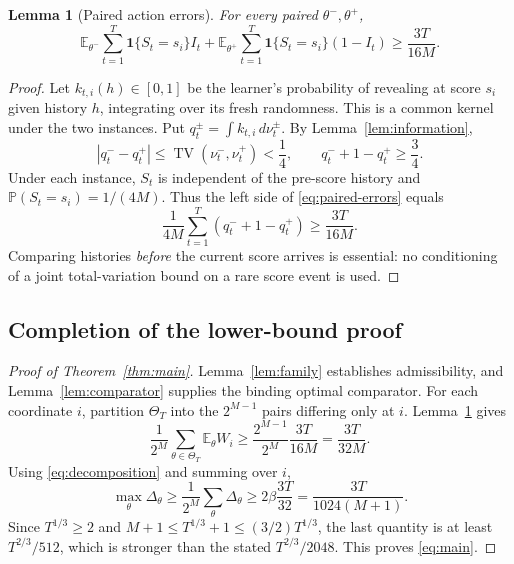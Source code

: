 \documentclass[11pt]{article}
\newtheorem{lemma}[theorem]{Lemma}
\theoremstyle{remark}
\newcommand{\E}{\mathbb E}
\newcommand{\Pp}{\mathbb P}
\newcommand{\ind}{\mathbf 1}
\newcommand{\TV}{\operatorname{TV}}
\begin{document}
\begin{lemma}[Paired action errors]
\label{lem:testing}
For every paired $\theta^-,\theta^+$,
\begin{equation}
 \E_{\theta^-}\sum_{t=1}^T\ind\{S_t=s_i\}I_t
 +\E_{\theta^+}\sum_{t=1}^T\ind\{S_t=s_i\}(1-I_t)
 \ge\frac{3T}{16M}.
 \label{eq:paired-errors}
\end{equation}
\end{lemma}
\begin{proof}
Let $k_{t,i}(h)\in[0,1]$ be the learner's probability of revealing at
score $s_i$ given history $h$, integrating over its fresh randomness.
This is a common kernel under the two instances. Put
$q_t^\pm=\int k_{t,i}\,d\nu_t^\pm$. By Lemma~\ref{lem:information},
\[
 |q_t^--q_t^+|\le\TV(\nu_t^-,\nu_t^+)<\frac14,
 \qquad q_t^-+1-q_t^+\ge\frac34.
\]
Under each instance, $S_t$ is independent of the pre-score history
and $\Pp(S_t=s_i)=1/(4M)$. Thus the left side of
\eqref{eq:paired-errors} equals
\[
 \frac1{4M}\sum_{t=1}^T(q_t^-+1-q_t^+)
 \ge\frac{3T}{16M}.
\]
Comparing histories \emph{before} the current score arrives is essential:
no conditioning of a joint total-variation bound on a rare score event
is used.
\end{proof}

\subsection{Completion of the lower-bound proof}

\begin{proof}[Proof of Theorem~\ref{thm:main}]
Lemma~\ref{lem:family} establishes admissibility, and
Lemma~\ref{lem:comparator} supplies the binding optimal comparator.
For each coordinate $i$, partition $\Theta_T$ into the $2^{M-1}$
pairs differing only at $i$. Lemma~\ref{lem:testing} gives
\[
 \frac1{2^M}\sum_{\theta\in\Theta_T}\E_\theta W_i
 \ge\frac{2^{M-1}}{2^M}\frac{3T}{16M}
 =\frac{3T}{32M}.
\]
Using \eqref{eq:decomposition} and summing over $i$,
\[
 \max_\theta\Delta_\theta
 \ge\frac1{2^M}\sum_\theta\Delta_\theta
 \ge2\beta\frac{3T}{32}
 =\frac{3T}{1024(M+1)}.
\]
Since $T^{1/3}\ge2$ and $M+1\le T^{1/3}+1\le(3/2)T^{1/3}$,
the last quantity is at least $T^{2/3}/512$, which is stronger than
the stated $T^{2/3}/2048$. This proves \eqref{eq:main}.
\end{proof}
\end{document}

